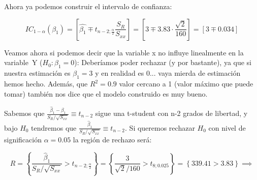 \begin{problem}[2]
Ahora ya podemos construir el intervalo de confianza:

\[ IC_{1-α}(β_1) = \left[ \hat{β_1} \mp t_{n-2;\frac{α}{2}} \frac{S_R}{S_{xx}} \right] = \left[ 3\mp 3.83·\frac{\sqrt{2}}{160} \right] = \left[ 3\mp 0.034\right]\]


Veamos ahora si podemos decir que la variable x no influye linealmente en la variable~Y ($H_0: β_1=0$): Deberíamos poder rechazar (y por bastante), ya que si nuestra estimación es $\hat{β_1} = 3$ y en realidad es 0... vaya mierda de estimación hemos hecho. Además, que $R^2 = 0.9$ valor cercano a 1 (valor máximo que puede tomar) también nos dice que el modelo construido es muy bueno.

Sabemos que $\frac{\hat{β}_1 - β_1}{S_R / \sqrt{S_{xx}}} \equiv t_{n-2}$ sigue una t-student con n-2 grados de libertad, y bajo $H_0$ tendremos que $\frac{\hat{β}_1 }{S_R / \sqrt{S_{xx}}} \equiv t_{n-2}$. Si queremos rechazar $H_0$ con nivel de significación $α=0.05$ la región de rechazo será:

\[R = \left\{ \frac{\hat{β}_1 }{S_R / \sqrt{S_{xx}}} > t_{n-2;\frac{α}{2}} \right\} = \left\{ \frac{3}{\sqrt{2} / 160} > t_{8;0.025} \right\} = \left\{ 339.41 > 3.83 \right\}\implies \]

\end{problem}



